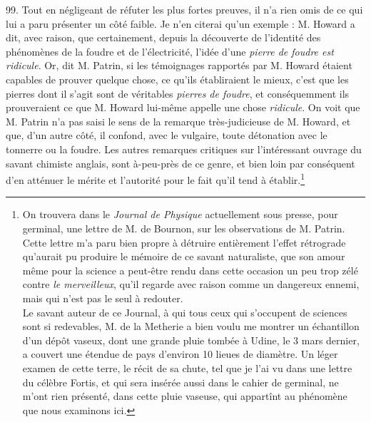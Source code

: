 \documentclass[a4paper, 11pt, oneside, polutonikogreek, french]{article}
\begin{document}
99. Tout en négligeant de réfuter les plus fortes preuves, il n'a rien omis de ce qui lui a paru présenter un côté faible. Je n'en citerai qu'un exemple : M. Howard a dit, avec raison, que \og certainement, depuis la découverte de l'identité des phénomènes de la foudre et de l'électricité, l'idée d'une \emph{pierre de foudre est ridicule}. \fg \og Or, dit M. Patrin, si les témoignages rapportés par M. Howard étaient capables de prouver quelque chose, ce qu'ils établiraient le mieux, c'est que les pierres dont il s'agit sont de véritables \emph{pierres de foudre}, et conséquemment ils prouveraient ce que M. Howard lui-même appelle une chose \emph{ridicule}. \fg On voit que M. Patrin n'a pas saisi le sens de la remarque très-judicieuse de M. Howard, et que, d'un autre côté, il confond, avec le vulgaire, toute détonation avec le tonnerre ou la foudre. Les autres remarques critiques sur l'intéressant ouvrage du savant chimiste anglais, sont à-peu-près de ce genre, et bien loin par conséquent d'en atténuer le mérite et l'autorité pour le fait qu'il tend à établir.\footnote{On trouvera dans le \emph{Journal de Physique} actuellement sous presse, pour germinal, une lettre de M. de Bournon, sur les observations de M. Patrin. Cette lettre m'a paru bien propre à détruire entièrement l'effet rétrograde qu'aurait pu produire le mémoire de ce savant naturaliste, que son amour même pour la science a peut-être rendu dans cette occasion un peu trop zélé contre \emph{le merveilleux}, qu'il regarde avec raison comme un dangereux ennemi, mais qui n'est pas le seul à redouter.\\
Le savant auteur de ce Journal, à qui tous ceux qui s'occupent de sciences sont si redevables, M. de la Metherie a bien voulu me montrer un échantillon d'un dépôt vaseux, dont une grande pluie tombée à Udine, le 3 mars dernier, a couvert une étendue de pays d'environ 10 lieues de diamètre. Un léger examen de cette terre, le récit de sa chute, tel que je l'ai vu dans une lettre du célèbre Fortis, et qui sera insérée aussi dans le cahier de germinal, ne m'ont rien présenté, dans cette pluie vaseuse, qui appartînt au phénomène que nous examinons ici.}
\end{document}
